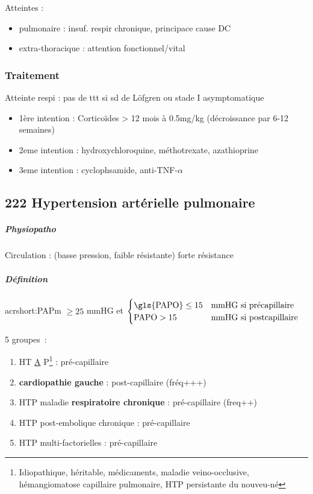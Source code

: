 \documentclass[11pt]{article}
\begin{document}
Atteintes :

\begin{itemize}
\item pulmonaire : insuf. respir chronique, principace cause DC
\item extra-thoracique : attention fonctionnel/vital
\end{itemize}


\subsubsection{Traitement}
\label{sec:orgb7a218f}
\label{sec:orgc05b9f6}
Atteinte respi : pas de ttt si sd de Löfgren ou stade I asymptomatique\\

\begin{itemize}
\item 1ère intention : Corticoïdes > 12 mois à 0.5mg/kg (décroissance par 6-12 semaines)
\item 2eme intention : hydroxychloroquine, méthotrexate, azathioprine
\item 3eme intention : cyclophsamide, anti-TNF-\(\alpha\)
\end{itemize}

\subsection{222 \textdagger{} Hypertension artérielle pulmonaire}
\label{sec:org9d312d8}

\subparagraph{Physiopatho}
\label{sec:org2293e57}
Circulation : (basse pression, faible résistante) \thus forte résistance

\subparagraph{Définition}
\label{sec:orge206bb8}
acrshort:PAPm \(\ge 25\) mmHG et
$\begin{cases}
  \text{\gls{PAPO}} \le 15 & \text{mmHG si précapillaire} \\
  \text{PAPO} > 15 & \text{mmHG si postcapillaire}
\end{cases}$

5 groupes :
\begin{enumerate}
\item HT \uline{A} P\footnote{Idiopathique, héritable, médicaments, maladie veino-occlusive, hémangiomatose capillaire
pulmonaire, HTP persistante du nouveu-né} :  pré-capillaire
\item \textbf{cardiopathie gauche}  : post-capillaire (fréq+++)
\item HTP maladie \textbf{respiratoire chronique}  : pré-capillaire (freq++)
\item HTP post-embolique chronique : pré-capillaire
\item HTP multi-factorielles : pré-capillaire
\end{enumerate}
\end{document}
